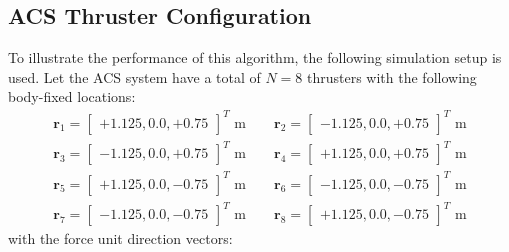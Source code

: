 \documentclass[]{BasiliskReportMemo}
\begin{document}
\subsection{ACS Thruster Configuration}
To illustrate the performance of this algorithm, the following simulation setup is used.  Let the ACS system have a total of $N = 8$ thrusters with the following body-fixed locations:
\begin{gather*}
	\label{eq:th:loc}
	\bm r_{1} = \begin{bmatrix} +1.125, 0.0, +0.75  \end{bmatrix}^{T} \text{ m}
	\quad\quad
	\bm r_{2} = \begin{bmatrix} -1.125, 0.0, +0.75  \end{bmatrix}^{T} \text{ m}
	\\
	\bm r_{3} = \begin{bmatrix} -1.125, 0.0, +0.75  \end{bmatrix}^{T}	 \text{ m}
	\quad\quad
	\bm r_{4} = \begin{bmatrix} +1.125, 0.0, +0.75  \end{bmatrix}^{T} \text{ m}
	\\
	\bm r_{5} = \begin{bmatrix} +1.125, 0.0, -0.75  \end{bmatrix}^{T}	 \text{ m}
	\quad\quad
	\bm r_{6} = \begin{bmatrix} -1.125, 0.0, -0.75  \end{bmatrix}^{T} \text{ m}
	\\
	\bm r_{7} = \begin{bmatrix} -1.125, 0.0, -0.75  \end{bmatrix}^{T}	 \text{ m}
	\quad\quad
	\bm r_{8} = \begin{bmatrix} +1.125, 0.0, -0.75  \end{bmatrix}^{T} \text{ m}
\end{gather*}
with the force unit direction vectors:
\end{document}
